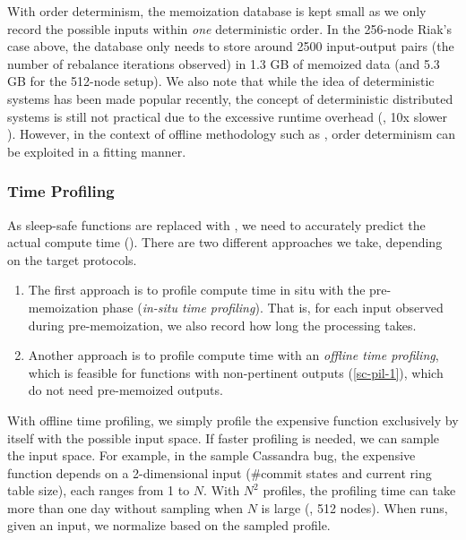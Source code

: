 %
With order determinism, the memoization database is kept small as we only
record the possible inputs within {\em one} deterministic order.  In the
256-node Riak's case above, the database only needs to store around 2500
input-output pairs (the number of rebalance iterations observed) in 1.3 GB
of memoized data (and 5.3 GB for the 512-node setup).
We also note that while the idea of deterministic systems has been made
popular recently,
the concept of deterministic distributed systems is still not practical
due to the excessive runtime overhead (\eg, 10x slower
\cite{Hunt+13-DDOS}).  However, in the context of offline methodology such
as \sck, order determinism can be exploited in a fitting manner.




\subsubsection{Time Profiling}
\label{sc-pil-4}

As sleep-safe functions are replaced with , we need to
accurately predict the actual compute time ().  There are two
different approaches we take, depending on the target protocols.
%
\begin{enumerate}
\item The first approach is to profile compute time in situ with
the pre-memoization phase ({\em in-situ time profiling}).  
That is, for each input observed during
pre-memoization, we also record how long the processing takes.
%
\item Another approach is to profile compute time with an {\em offline
time  profiling}, which is feasible for functions with non-pertinent outputs
(\sec\ref{sc-pil-1}), which do not need pre-memoized outputs.  
\end{enumerate}

With offline time profiling, we simply profile the expensive function
exclusively by itself with the possible input space.
If faster profiling is needed, we can sample the input space.
For example, in the sample Cassandra bug,
the expensive function depends on a 2-dimensional input (\#commit states
and current ring table size), each ranges from 1 to $N$.  
With $N^2$ profiles, the profiling time can
take more than 
one day without sampling when $N$ is large (\eg, 512 nodes).  When \sck
runs, given an input, we normalize  based on the sampled profile.

